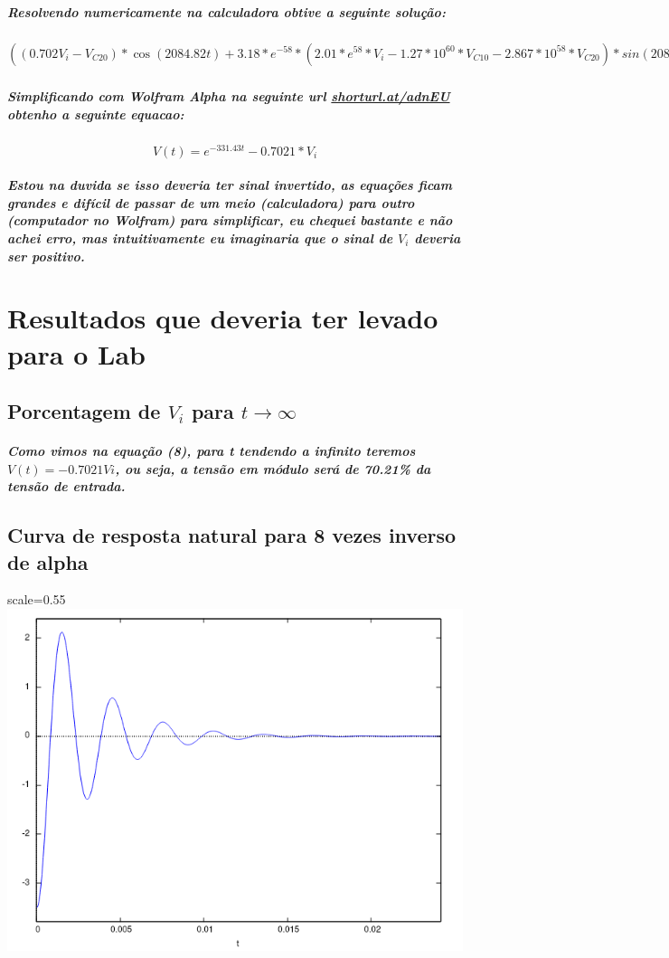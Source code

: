 \documentclass[12pt,twoside, a4paper, twocolumn]{article}
\begin{document}
\subparagraph*{Resolvendo numericamente na calculadora obtive a seguinte solução:}

\subparagraph*{$((0.702 V_i - V_{C20})*\cos{(2084.82t)}+3.18*e^{-58}*(2.01*e^{58}*V_i-1.27*10^{60}*V_{C10}-2.867*10^{58}*V_{C20})*sin(2084.82t))*e^{(-331.43t)} - 0.7021 * V_i$}


\subparagraph*{Simplificando com Wolfram Alpha na seguinte url \url{shorturl.at/adnEU} obtenho a seguinte equacao:}

\begin{equation}
    V(t) = e^{-331.43t} - 0.7021 * V_i
\end{equation}

\subparagraph*{Estou na duvida se isso deveria ter sinal invertido, as equações ficam grandes e difícil de passar de um meio (calculadora) para outro (computador no Wolfram) para simplificar, eu chequei bastante e não achei erro, mas intuitivamente eu imaginaria que o sinal de $V_i$ deveria ser positivo.}

\section{Resultados que deveria ter levado para o Lab}

\subsection{Porcentagem de $V_i$ para $t \rightarrow \infty$}
\subparagraph*{Como vimos na equação (8), para t tendendo a infinito teremos $V(t) = -0.7021 Vi$, ou seja, a tensão em módulo será de 70.21\% da tensão de entrada.}

\subsection{Curva de resposta natural para 8 vezes inverso de alpha}

\begin{adjustbox}{scale=0.55}
    \includegraphics{Figure_3.png}
\end{adjustbox}
\end{document}

